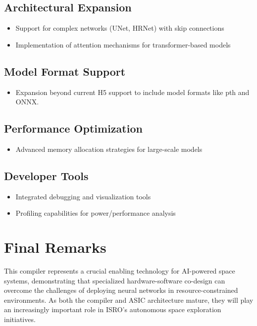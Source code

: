 \documentclass[12pt]{report}
\begin{document}
\subsection{Architectural Expansion}
\begin{itemize}
    \item Support for complex networks (UNet, HRNet) with skip connections
    \item Implementation of attention mechanisms for transformer-based models
\end{itemize}


\subsection{Model Format Support}
\begin{itemize}
    \item Expansion beyond current H5 support to include model formats like pth and ONNX.
\end{itemize}

\subsection{Performance Optimization}
\begin{itemize}
    \item Advanced memory allocation strategies for large-scale models
\end{itemize}

\subsection{Developer Tools}
\begin{itemize}
    \item Integrated debugging and visualization tools
    \item Profiling capabilities for power/performance analysis
\end{itemize}

\section{Final Remarks}
This compiler represents a crucial enabling technology for AI-powered space systems, demonstrating that specialized hardware-software co-design can overcome the challenges of deploying neural networks in resource-constrained environments. As both the compiler and ASIC architecture mature, they will play an increasingly important role in ISRO's autonomous space exploration initiatives.

\nocite{*}



\end{document}

